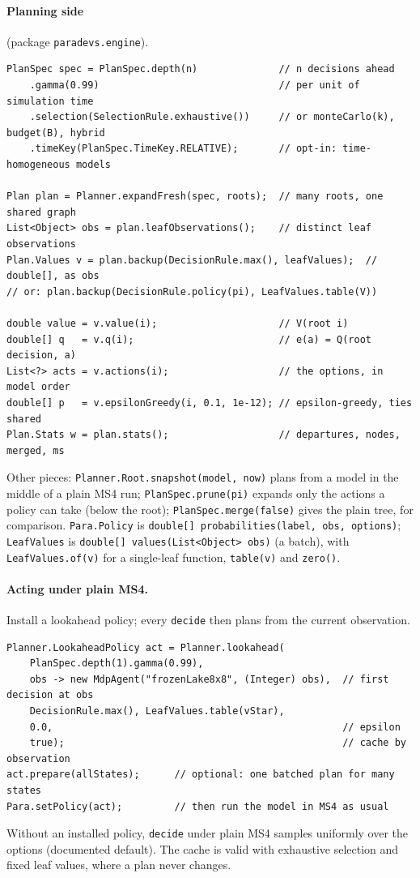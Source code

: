 \documentclass[11pt]{article}
\newcommand{\code}[1]{\texttt{#1}}
\theoremstyle{plain}
\begin{document}
\paragraph{Planning side} (package \code{paradevs.engine}).
\begin{lstlisting}
PlanSpec spec = PlanSpec.depth(n)              // n decisions ahead
    .gamma(0.99)                               // per unit of simulation time
    .selection(SelectionRule.exhaustive())     // or monteCarlo(k), budget(B), hybrid
    .timeKey(PlanSpec.TimeKey.RELATIVE);       // opt-in: time-homogeneous models

Plan plan = Planner.expandFresh(spec, roots);  // many roots, one shared graph
List<Object> obs = plan.leafObservations();    // distinct leaf observations
Plan.Values v = plan.backup(DecisionRule.max(), leafValues);  // double[], as obs
// or: plan.backup(DecisionRule.policy(pi), LeafValues.table(V))

double value = v.value(i);                     // V(root i)
double[] q   = v.q(i);                         // e(a) = Q(root decision, a)
List<?> acts = v.actions(i);                   // the options, in model order
double[] p   = v.epsilonGreedy(i, 0.1, 1e-12); // epsilon-greedy, ties shared
Plan.Stats w = plan.stats();                   // departures, nodes, merged, ms
\end{lstlisting}
Other pieces: \code{Planner.Root.snapshot(model, now)} plans from a model in the middle of a plain MS4 run;
\code{PlanSpec.prune(pi)} expands only the actions a policy can take (below the root); \code{PlanSpec.merge(false)}
gives the plain tree, for comparison. \code{Para.Policy} is
\code{double[] probabilities(label, obs, options)}; \code{LeafValues} is \code{double[] values(List<Object> obs)} (a
batch), with \code{LeafValues.of(v)} for a single-leaf function, \code{table(v)} and \code{zero()}.

\paragraph{Acting under plain MS4.} Install a lookahead policy; every \code{decide} then plans from the current
observation.
\begin{lstlisting}
Planner.LookaheadPolicy act = Planner.lookahead(
    PlanSpec.depth(1).gamma(0.99),
    obs -> new MdpAgent("frozenLake8x8", (Integer) obs),  // first decision at obs
    DecisionRule.max(), LeafValues.table(vStar),
    0.0,                                                  // epsilon
    true);                                                // cache by observation
act.prepare(allStates);      // optional: one batched plan for many states
Para.setPolicy(act);         // then run the model in MS4 as usual
\end{lstlisting}
Without an installed policy, \code{decide} under plain MS4 samples uniformly over the options (documented default).
The cache is valid with exhaustive selection and fixed leaf values, where a plan never changes.
\end{document}
